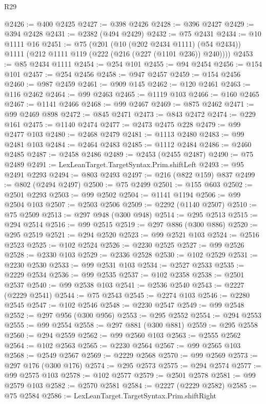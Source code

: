 \begin{lexlean}{R29}
\begin{coremodule}
@2426 := @400 @2425
@2427 := @398 @2426
@2428 := @396 @2427
@2429 := @394 @2428
@2431 := @2382 (@494 @2429)
@2432 := @75 @2431
@2434 := @10 @1111 @16
@2451 := @75
    (@201
      (@10 (@202 @2434 @1111) (@54 @2434))
      @1111
      (@212 @1111 @119 (@222 (@216 (@227 (@1101 @236)) @240))))
@2453 := @85 @2434 @1111
@2454 := @254 @101
@2455 := @94 @2454
@2456 := @154 @101
@2457 := @254 @2456
@2458 := @947 @2457
@2459 := @154 @2456
@2460 := @987 @2459
@2461 := @909 @145
@2462 := @120 @2461
@2463 := @116 @2462
@2464 := @99 @2463
@2465 := @1119 @103
@2466 := @160 @2465
@2467 := @1141 @2466
@2468 := @99 @2467
@2469 := @875 @2462
@2471 := @99 @2469 @898
@2472 := @845 @2471
@2473 := @843 @2472
@2474 := @229 @161
@2475 := @1140 @2474
@2477 := @2473 @2475 @228
@2479 := @99 @2477 @103
@2480 := @2468 @2479
@2481 := @1113 @2480
@2483 := @99 @2481 @103
@2484 := @2464 @2483
@2485 := @1112 @2484
@2486 := @2460 @2485
@2487 := @2458 @2486
@2489 := @2453 (@2455 @2487)
@2490 := @75 @2489
@2491 := LexLeanTarget.TargetSyntax.Prim.shiftLeft
@2493 := @95 @2491 @2293
@2494 := @803 @2493
@2497 := @216 (@822 @159) @837
@2499 := @802 (@2494 @2497)
@2500 := @75 @2499
@2501 := @155 @603
@2502 := @2501 @2293
@2503 := @99 @2502
@2504 := @1141 @1194
@2506 := @99 @2504 @103
@2507 := @2503 @2506
@2509 := @2292 (@1140 @2507)
@2510 := @75 @2509
@2513 := @297 @948 (@300 @948)
@2514 := @295 @2513
@2515 := @294 @2514
@2516 := @99 @2515
@2519 := @297 @886 (@300 @886)
@2520 := @295 @2519
@2521 := @294 @2520
@2523 := @99 @2521 @103
@2524 := @2516 @2523
@2525 := @102 @2524
@2526 := @2230 @2525
@2527 := @99 @2526
@2528 := @2330 @103
@2529 := @2336 @2528
@2530 := @102 @2529
@2531 := @2230 @2530
@2533 := @99 @2531 @103
@2534 := @2527 @2533
@2535 := @2229 @2534
@2536 := @99 @2535
@2537 := @102 @2358
@2538 := @2501 @2537
@2540 := @99 @2538 @103
@2541 := @2536 @2540
@2543 := @2227 (@2229 @2541)
@2544 := @75 @2543
@2545 := @2274 @103
@2546 := @2280 @2545
@2547 := @102 @2546
@2548 := @2230 @2547
@2549 := @99 @2548
@2552 := @297 @956 (@300 @956)
@2553 := @295 @2552
@2554 := @294 @2553
@2555 := @99 @2554
@2558 := @297 @881 (@300 @881)
@2559 := @295 @2558
@2560 := @294 @2559
@2562 := @99 @2560 @103
@2563 := @2555 @2562
@2564 := @102 @2563
@2565 := @2230 @2564
@2567 := @99 @2565 @103
@2568 := @2549 @2567
@2569 := @2229 @2568
@2570 := @99 @2569
@2573 := @297 @176 (@300 @176)
@2574 := @295 @2573
@2575 := @294 @2574
@2577 := @99 @2575 @103
@2578 := @102 @2577
@2579 := @2501 @2578
@2581 := @99 @2579 @103
@2582 := @2570 @2581
@2584 := @2227 (@2229 @2582)
@2585 := @75 @2584
@2586 := LexLeanTarget.TargetSyntax.Prim.shiftRight

\end{coremodule}
\end{lexlean}
